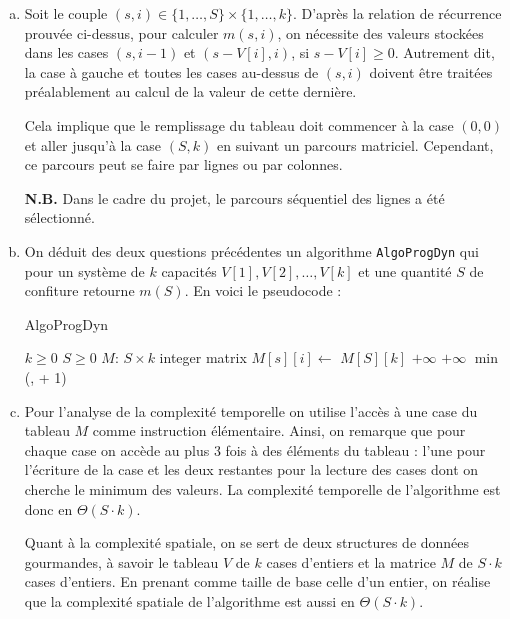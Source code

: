 \documentclass[12pt,a4paper]{article}
\begin{document}
\begin{enumerate}[a)]
 \item Soit le couple $(s,i) \in \{1,\dotsc,S\} \times \{1,\dotsc,k\}$. D'apr\`es la relation de r\'ecurrence prouv\'ee ci-dessus, pour calculer $m(s,i)$, on n\'ecessite des valeurs stock\'ees dans les cases $(s,i-1)$ et $(s-V[i],i)$, si $s-V[i] \geq 0$. Autrement dit, la case \`a gauche et toutes les cases au-dessus de $(s,i)$ doivent \^etre trait\'ees pr\'ealablement au calcul de la valeur de cette derni\`ere.
 
 Cela implique que le remplissage du tableau doit commencer \`a la case $(0,0)$ et aller jusqu'\`a la case $(S,k)$ en suivant un parcours matriciel. Cependant, ce parcours peut se faire par lignes ou par colonnes. 
 
 {\bfseries N.B.} Dans le cadre du projet, le parcours s\'equentiel des lignes a \'et\'e s\'electionn\'e.
 
 \item On d\'eduit des deux questions pr\'ec\'edentes un algorithme \texttt{AlgoProgDyn} qui pour un syst\`eme de $k$ capacit\'es $V[1],V[2],\dotsc,V[k]$ et une quantit\'e $S$ de confiture retourne $m(S)$. En voici le pseudocode :
 
\begin{algorithm}
\caption{AlgoProgDyn}
\begin{algorithmic}[1]
\Require $k \geq 0$ \AND $S \geq 0$
    \State $M$: $S \times k$ integer matrix
            \State $M[s][i] \gets $ 
        \EndFor
    \EndFor
    \State \Return $M[S][k]$
\EndFunction
\Statex
{}
        \State {}
        \State \Return $+\infty$
        \State \Return $+\infty$
    \Else 
        \State \Return $\min$(,  + 1)
    \EndIf
\EndFunction
\end{algorithmic}
\end{algorithm}

 \item Pour l'analyse de la complexit\'e temporelle on utilise l'acc\`es \`a une case du tableau $M$ comme instruction \'el\'ementaire. Ainsi, on remarque que pour chaque case on acc\`ede au plus 3 fois \`a des \'el\'ements du tableau : l'une pour l'\'ecriture de la case et les deux restantes pour la lecture des cases dont on cherche le minimum des valeurs.
La complexit\'e temporelle de l'algorithme est donc en $\Theta(S\cdot k)$.

Quant \`a la complexit\'e spatiale, on se sert de deux structures de donn\'ees gourmandes, \`a savoir le tableau $V$ de $k$ cases d'entiers et la matrice $M$ de $S\cdot k$ cases d'entiers. En prenant comme taille de base celle d'un entier, on r\'ealise que la complexit\'e spatiale de l'algorithme est aussi en $\Theta(S\cdot k)$.
\end{enumerate}
\end{document}
